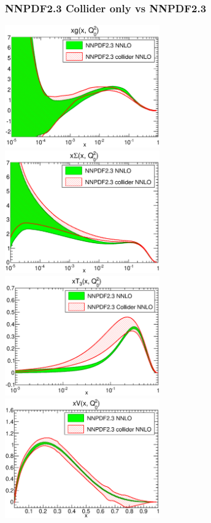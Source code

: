 \documentclass[10pt]{beamer}
\begin{document}
\begin{frame}
\frametitle{NNPDF2.3 Collider only vs NNPDF2.3}
   \includegraphics[width=0.5\textwidth]{xg_Q_2_log-23-vs-23coll-nnlo.eps}
 \includegraphics[width=0.5\textwidth]{xSinglet_Q_2_log-23-vs-23coll-nnlo.eps}\\
    \includegraphics[width=0.5\textwidth]{xT3_Q_2_log-23-vs-23coll-nnlo.eps}
 \includegraphics[width=0.5\textwidth]{xV_Q_2_lin-23-vs-23coll-nnlo.eps}
 \end{frame}
\end{document}
